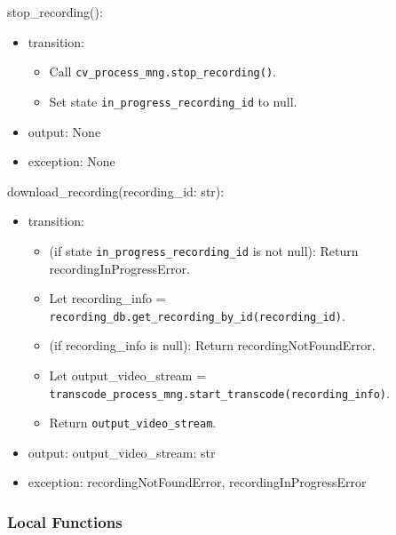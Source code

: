 \documentclass[12pt, titlepage]{article}
\begin{document}
\noindent stop\_recording():
\begin{itemize}
  \item transition:
        \begin{itemize}
          \item Call \texttt{cv\_process\_mng.stop\_recording()}.
          \item Set state \texttt{in\_progress\_recording\_id} to null.
        \end{itemize}
  \item output: None
  \item exception: None
\end{itemize}

\noindent download\_recording(recording\_id: str):
\begin{itemize}
  \item transition:
        \begin{itemize}
          \item (if state \texttt{in\_progress\_recording\_id} is not null): Return recordingInProgressError.
          \item Let recording\_info =
                \texttt{recording\_db.get\_recording\_by\_id(recording\_id)}.
          \item (if recording\_info is null): Return recordingNotFoundError.
          \item Let output\_video\_stream =
                \texttt{transcode\_process\_mng.start\_transcode(recording\_info)}.
          \item Return \texttt{output\_video\_stream}.
        \end{itemize}
  \item output: output\_video\_stream: str
  \item exception: recordingNotFoundError, recordingInProgressError
\end{itemize}

\subsubsection{Local Functions}
\end{document}
